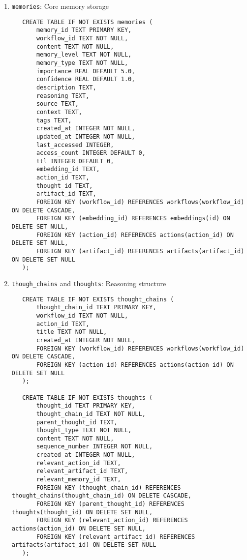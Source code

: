 \documentclass[12pt,a4paper]{article}
\newcommand{\code}[1]{\texttt{#1}}
\begin{document}
\begin{enumerate}[label=\arabic*.]
    \item \code{memories}: Core memory storage
    \begin{pageablecode}
    \begin{verbatim}
   CREATE TABLE IF NOT EXISTS memories (
       memory_id TEXT PRIMARY KEY,
       workflow_id TEXT NOT NULL,
       content TEXT NOT NULL,
       memory_level TEXT NOT NULL,
       memory_type TEXT NOT NULL,
       importance REAL DEFAULT 5.0,
       confidence REAL DEFAULT 1.0,
       description TEXT,
       reasoning TEXT,
       source TEXT,
       context TEXT,
       tags TEXT,
       created_at INTEGER NOT NULL,
       updated_at INTEGER NOT NULL,
       last_accessed INTEGER,
       access_count INTEGER DEFAULT 0,
       ttl INTEGER DEFAULT 0,
       embedding_id TEXT,
       action_id TEXT,
       thought_id TEXT,
       artifact_id TEXT,
       FOREIGN KEY (workflow_id) REFERENCES workflows(workflow_id) ON DELETE CASCADE,
       FOREIGN KEY (embedding_id) REFERENCES embeddings(id) ON DELETE SET NULL,
       FOREIGN KEY (action_id) REFERENCES actions(action_id) ON DELETE SET NULL,
       FOREIGN KEY (artifact_id) REFERENCES artifacts(artifact_id) ON DELETE SET NULL
   );
    \end{verbatim}
    \end{pageablecode}

    \item \code{though\1\_chains} and \code{thoughts}: Reasoning structure
    \begin{pageablecode}
    \begin{verbatim}
   CREATE TABLE IF NOT EXISTS thought_chains (
       thought_chain_id TEXT PRIMARY KEY,
       workflow_id TEXT NOT NULL,
       action_id TEXT,
       title TEXT NOT NULL,
       created_at INTEGER NOT NULL,
       FOREIGN KEY (workflow_id) REFERENCES workflows(workflow_id) ON DELETE CASCADE,
       FOREIGN KEY (action_id) REFERENCES actions(action_id) ON DELETE SET NULL
   );

   CREATE TABLE IF NOT EXISTS thoughts (
       thought_id TEXT PRIMARY KEY,
       thought_chain_id TEXT NOT NULL,
       parent_thought_id TEXT,
       thought_type TEXT NOT NULL,
       content TEXT NOT NULL,
       sequence_number INTEGER NOT NULL,
       created_at INTEGER NOT NULL,
       relevant_action_id TEXT,
       relevant_artifact_id TEXT,
       relevant_memory_id TEXT,
       FOREIGN KEY (thought_chain_id) REFERENCES thought_chains(thought_chain_id) ON DELETE CASCADE,
       FOREIGN KEY (parent_thought_id) REFERENCES thoughts(thought_id) ON DELETE SET NULL,
       FOREIGN KEY (relevant_action_id) REFERENCES actions(action_id) ON DELETE SET NULL,
       FOREIGN KEY (relevant_artifact_id) REFERENCES artifacts(artifact_id) ON DELETE SET NULL
   );
    \end{verbatim}
    \end{pageablecode}
\end{enumerate}
\end{document}
